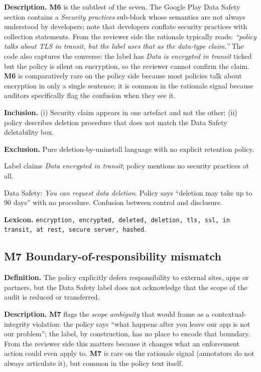 \documentclass[11pt,a4paper]{article}
\newcommand{\code}[1]{\textsf{\textbf{#1}}}
\begin{document}
\textbf{Description.} \code{M6} is the subtlest of the seven. The
Google Play Data Safety section contains a \emph{Security practices}
sub-block whose semantics are not always understood by developers;
\citet{khandelwal2024unpacking} note that developers conflate
security practices with collection statements. From the reviewer side
the rationale typically reads: \textit{``policy talks about TLS in
transit, but the label uses that as the data-type claim.''} The code
also captures the converse: the label has \textsl{Data is encrypted in
transit} ticked but the policy is silent on encryption, so the
reviewer cannot confirm the claim. \code{M6} is comparatively rare on
the policy side because most policies talk about encryption in only
a single sentence; it is common in the rationale signal because
auditors specifically flag the confusion when they see it.

\textbf{Inclusion.} (i) Security claim appears in one artefact and
not the other; (ii) policy describes deletion procedure that does
not match the Data Safety deletability box.

\textbf{Exclusion.} Pure deletion-by-uninstall language with no
explicit retention policy.

\begin{rationale}
Label claims \textsl{Data encrypted in transit}; policy mentions no
security practices at all.
\end{rationale}
\begin{rationale}
[APP-$0833$] Data Safety: \textsl{You can request data deletion}.
Policy says ``deletion may take up to $90$ days'' with no
procedure. Confusion between control and disclosure.
\end{rationale}

\textbf{Lexicon.} \texttt{encryption, encrypted, deleted, deletion,
tls, ssl, in transit, at rest, secure server, hashed}.

\subsection{\code{M7} Boundary-of-responsibility mismatch}
\label{sec:M7}
\textbf{Definition.} The policy explicitly defers responsibility to
external sites, apps or partners, but the Data Safety label does not
acknowledge that the scope of the audit is reduced or transferred.

\textbf{Description.} \code{M7} flags the \emph{scope ambiguity} that
\citet{nissenbaum2004privacy} would frame as a contextual-integrity
violation: the policy says ``what happens after you leave our app is
not our problem''; the label, by construction, has no place to encode
that boundary. From the reviewer side this matters because it changes
what an enforcement action could even apply to. \code{M7} is rare on
the rationale signal (annotators do not always articulate it), but
common in the policy text itself.
\end{document}
